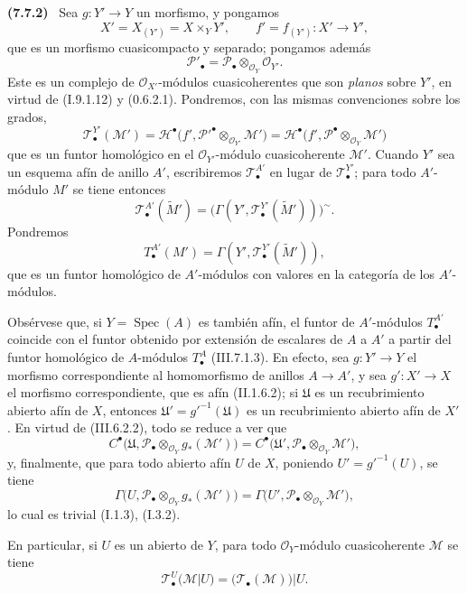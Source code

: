 \documentclass[10pt,oneside]{book}
\newcommand{\sref}[2][]{\textup{(#2)}}
\newenvironment{env}[1][]{\par\medskip\noindent\textbf{(#1)}\ }{\par}
\begin{document}
\begin{env}[7.7.2]
\label{III.7.7.2}
Sea $g:Y'\to Y$ un morfismo, y pongamos
\[
  X'=X_{(Y')}=X\times_Y Y',
  \qquad
  f'=f_{(Y')}:X'\longrightarrow Y',
\]
que es un morfismo cuasicompacto y separado; pongamos además
\[
  \mathscr P'_\bullet
  =\mathscr P_\bullet\otimes_{\mathscr O_Y}\mathscr O_{Y'}.
\]
Este es un complejo de $\mathscr O_{X'}$-módulos cuasicoherentes que son \emph{planos}
sobre $Y'$, en virtud de \sref[I]{I.9.1.12} y \sref[0]{0.6.2.1}. Pondremos,
con las mismas convenciones sobre los grados,
\[
  \mathscr T^{Y'}_\bullet(\mathscr M')
  =\mathscr H^\bullet
    \bigl(f',\mathscr P'^\bullet\otimes_{\mathscr O_{Y'}}\mathscr M'\bigr)
  =\mathscr H^\bullet
    \bigl(f',\mathscr P^\bullet\otimes_{\mathscr O_Y}\mathscr M'\bigr)
  \tag{7.7.2.1}\label{III.7.7.2.1}
\]
que es un funtor homológico en el $\mathscr O_{Y'}$-módulo cuasicoherente
$\mathscr M'$. Cuando $Y'$ sea un esquema afín de anillo $A'$, escribiremos
$\mathscr T^{A'}_\bullet$ en lugar de $\mathscr T^{Y'}_\bullet$; para todo
$A'$-módulo $M'$ se tiene entonces
\[
  \mathscr T^{A'}_\bullet(\widetilde{M}')
  =\bigl(\Gamma(Y',\mathscr T^{Y'}_\bullet(\widetilde{M}'))\bigr)^\sim.
\]
Pondremos
\[
  T^{A'}_\bullet(M')
  =\Gamma(Y',\mathscr T^{Y'}_\bullet(\widetilde{M}')),
\]
que es un funtor homológico de $A'$-módulos con valores en la categoría de los
$A'$-módulos.

Obsérvese que, si $Y=\operatorname{Spec}(A)$ es también afín, el funtor de
$A'$-módulos $T^{A'}_\bullet$ coincide con el funtor obtenido por extensión de
escalares de $A$ a $A'$ a partir del funtor homológico de $A$-módulos
$T^A_\bullet$ \sref{III.7.1.3}. En efecto, sea $g:Y'\to Y$ el morfismo
correspondiente al homomorfismo de anillos $A\to A'$, y sea $g':X'\to X$ el
morfismo correspondiente, que es afín \sref[II]{II.1.6.2}; si $\mathfrak U$ es
un recubrimiento abierto afín de $X$, entonces
$\mathfrak U'=g'^{-1}(\mathfrak U)$ es un recubrimiento abierto afín de $X'$.
En virtud de \sref{III.6.2.2}, todo se reduce a ver que
\[
  C^\bullet
    \bigl(\mathfrak U,
      \mathscr P_\bullet\otimes_{\mathscr O_Y}g_*(\mathscr M')\bigr)
  =C^\bullet
    \bigl(\mathfrak U',
      \mathscr P_\bullet\otimes_{\mathscr O_Y}\mathscr M'\bigr),
\]
y, finalmente, que para todo abierto afín $U$ de $X$, poniendo
$U'=g'^{-1}(U)$, se tiene
\[
  \Gamma
    \bigl(U,\mathscr P_\bullet\otimes_{\mathscr O_Y}g_*(\mathscr M')\bigr)
  =\Gamma
    \bigl(U',\mathscr P_\bullet\otimes_{\mathscr O_Y}\mathscr M'\bigr),
\]
lo cual es trivial \sref[I]{I.1.3}, \sref[I]{I.3.2}.

En particular, si $U$ es un abierto de $Y$, para todo
$\mathscr O_Y$-módulo cuasicoherente $\mathscr M$ se tiene
\[
  \mathscr T^U_\bullet(\mathscr M|U)
  =\bigl(\mathscr T_\bullet(\mathscr M)\bigr)|U.
  \tag{7.7.2.2}\label{III.7.7.2.2}
\]
\end{env}
\end{document}
